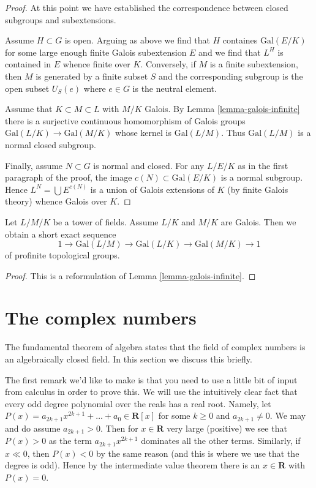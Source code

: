 \begin{proof}
\medskip\noindent
At this point we have established the correspondence between closed
subgroups and subextensions.

\medskip\noindent
Assume $H \subset G$ is open. Arguing as above we find that
$H$ containes $\text{Gal}(E/K)$ for some large enough finite
Galois subextension $E$ and we find that $L^H$ is contained
in $E$ whence finite over $K$. Conversely, if $M$ is a finite
subextension, then $M$ is generated by a finite subset $S$
and the corresponding subgroup is the open subset $U_S(e)$
where $e \in G$ is the neutral element.

\medskip\noindent
Assume that $K \subset M \subset L$ with $M/K$ Galois.
By Lemma \ref{lemma-galois-infinite} there is a surjective
continuous homomorphism of Galois groups
$\text{Gal}(L/K) \to \text{Gal}(M/K)$ whose
kernel is $\text{Gal}(L/M)$. Thus $\text{Gal}(L/M)$ is a normal
closed subgroup.

\medskip\noindent
Finally, assume $N \subset G$ is normal and closed. For any
$L/E/K$ as in the first paragraph of the proof, the image
$c(N) \subset \text{Gal}(E/K)$ is a normal subgroup.
Hence $L^N = \bigcup E^{c(N)}$ is a union of Galois extensions
of $K$ (by finite Galois theory) whence Galois over $K$.
\end{proof}

\begin{lemma}
\label{lemma-ses-infinite-galois}
Let $L/M/K$ be a tower of fields. Assume $L/K$ and $M/K$ are Galois.
Then we obtain a short exact sequence
$$
1 \to \text{Gal}(L/M) \to \text{Gal}(L/K) \to \text{Gal}(M/K) \to 1
$$
of profinite topological groups.
\end{lemma}

\begin{proof}
This is a reformulation of Lemma \ref{lemma-galois-infinite}.
\end{proof}






\section{The complex numbers}
\label{section-complex-numbers}

\noindent
The fundamental theorem of algebra states that the field of complex numbers
is an algebraically closed field. In this section we discuss this
briefly.

\medskip\noindent
The first remark we'd like to make is that you need to use a little
bit of input from calculus in order to prove this. We will use the
intuitively clear fact that every odd degree polynomial over
the reals has a real root. Namely, let
$P(x) = a_{2k + 1} x^{2k + 1} + \ldots + a_0 \in \mathbf{R}[x]$
for some $k \geq 0$ and $a_{2k + 1} \not = 0$.
We may and do assume $a_{2k + 1} > 0$. Then for $x \in \mathbf{R}$
very large (positive) we see that $P(x) > 0$ as the term
$a_{2k + 1} x^{2k + 1}$ dominates all the other terms. Similarly,
if $x \ll 0$, then $P(x) < 0$ by the same reason (and this is where
we use that the degree is odd). Hence by the intermediate value
theorem there is an $x \in \mathbf{R}$ with $P(x) = 0$.

